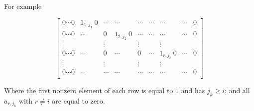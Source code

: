 For example

\[
\begin{bmatrix}
0 \cdots 0 & 1_{1,j_1} \ 0 & \cdots & \cdots & \cdots & \cdots & \cdots & \cdots & 0\\
0 \cdots 0 & \cdots  & 0 & 1_{2,j_2} \ 0 & \cdots & \cdots & \cdots & \cdots & 0\\
\vdots&&\vdots&&\vdots&&\vdots\\
0 \cdots 0 & \cdots & 0 & \cdots & 0 & \cdots & 1_{r,j_r} \ 0& \cdots & 0\\
\vdots&&\vdots&&\vdots&&\vdots\\
0 \cdots 0 &\cdots & \cdots & \cdots & \cdots & \cdots & \cdots & \cdots & 0\\
\end{bmatrix}
\]

Where the first nonzero element of each row is equal to $1$ and has $j_k \geq i$; and all $a_{r,j_k}$ with $r \neq i$ are equal to zero.
\\
